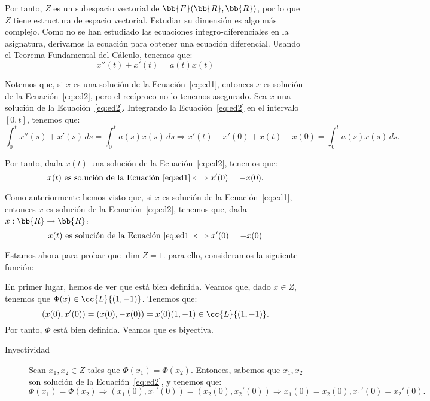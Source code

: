 \documentclass[12pt]{article}
\begin{document}
\begin{ejercicio}
        Por tanto, $Z$ es un subespacio vectorial de $\bb{F}(\bb{R},\bb{R})$, por lo que $Z$ tiene estructura de espacio vectorial. Estudiar su dimensión es algo más complejo. Como no se han estudiado las ecuaciones integro-diferenciales en la asignatura, derivamos la ecuación para obtener una ecuación diferencial. Usando el Teorema Fundamental del Cálculo, tenemos que:
        \begin{equation}\label{eq:ed2}
            x''(t) + x'(t)= a(t)x(t)
        \end{equation}

        Notemos que, si $x$ es una solución de la Ecuación~\eqref{eq:ed1}, entonces $x$ es solución de la Ecuación~\eqref{eq:ed2}, pero el recíproco no lo tenemos asegurado. Sea $x$ una solución de la Ecuación~\eqref{eq:ed2}. Integrando la Ecuación~\eqref{eq:ed2} en el intervalo $[0,t]$, tenemos que:
        \begin{equation*}
            \int_{0}^t x''(s) + x'(s)\,ds = \int_{0}^t a(s)x(s)\,ds \Longrightarrow x'(t) - x'(0)  + x(t) - x(0) = \int_{0}^t a(s)x(s)\,ds.
        \end{equation*}

        Por tanto, dada $x(t)$ una solución de la Ecuación~\eqref{eq:ed2}, tenemos que:
        \begin{equation*}
            x(t) \text{ es solución de la Ecuación~\eqref{eq:ed1}} \Longleftrightarrow x'(0) = -x(0).
        \end{equation*}

        Como anteriormente hemos visto que, si $x$ es solución de la Ecuación~\eqref{eq:ed1}, entonces $x$ es solución de la Ecuación~\eqref{eq:ed2}, tenemos que, dada $x:\bb{R}\to \bb{R}$:
        \begin{equation*}
            x(t) \text{ es solución de la Ecuación~\eqref{eq:ed1}} \Longleftrightarrow x'(0) = -x(0)
        \end{equation*}

        Estamos ahora para probar que $\dim Z=1$. para ello, consideramos la siguiente función:

        En primer lugar, hemos de ver que está bien definida. Veamos que, dado $x\in Z$, tenemos que $\Phi(x)\in \cc{L}\{(1,-1)\}$. Tenemos que:
        \begin{equation*}
            (x(0),x'(0)) = (x(0),-x(0)) = x(0)(1,-1) \in \cc{L}\{(1,-1)\}.
        \end{equation*}
        Por tanto, $\Phi$ está bien definida. Veamos que es biyectiva.
        \begin{description}
            \item[Inyectividad] Sean $x_1,x_2\in Z$ tales que $\Phi(x_1)=\Phi(x_2)$. Entonces, sabemos que $x_1,x_2$ son solución de la Ecuación~\eqref{eq:ed2}, y tenemos que:
            \begin{equation*}
                \Phi(x_1) = \Phi(x_2) \Longrightarrow (x_1(0),x_1'(0)) = (x_2(0),x_2'(0)) \Longrightarrow x_1(0) = x_2(0), x_1'(0) = x_2'(0).
            \end{equation*}


\end{description}
\end{ejercicio}
\end{document}
